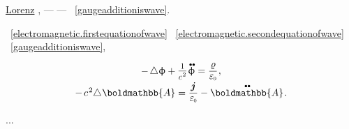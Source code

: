 \vspace{-0.2em}\noindent
{}
\href{https://en.wikipedia.org/wiki/Lorenz_gauge_condition}{Lorenz}
,
\:---
\href{https://en.wikipedia.org/wiki/Harmonic_function}{}\:--- ~\eqref{gaugeadditioniswave}.

~\eqref{electromagnetic.firstequationofwave} ~\eqref{electromagnetic.secondequationofwave} ~\eqref{gaugeadditioniswave},   

\nopagebreak\begin{equation}
\begin{array}{c}
- \hspace{-0.1ex} \Laplacian \upphi + \raisemath{.07em}{\scalebox{0.84}{$\displaystyle \frac{\raisemath{-0.16em}{1}}{\raisemath{-0.1em}c^{\hspace{.16ex}2}}$}} \hspace{.16ex} \mathdotdotabove{\upphi} = \smash{\displaystyle \frac{\chargedensity}{\raisemath{.16em}{\vacuumpermittivity}}}
\hspace{.1ex} ,
\\[.5em]
- \hspace{.3ex} c^{\hspace{.16ex}2} \hspace{-0.4ex} \Laplacian \hspace{.05ex} \boldmathbb{A} = \displaystyle \frac{\currentdensity}{\raisemath{.16em}{\vacuumpermittivity}} - \mathdotdotabove{\boldmathbb{A}}
\hspace{.2ex} .
\end{array}
\end{equation}

...



